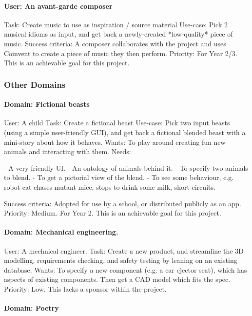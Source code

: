\documentclass[10pt]{article}
\begin{document}
\begin{appendices}
\paragraph{User: An avant-garde composer}   
Task: Create music to use as inspiration / source material   
Use-case: Pick 2 musical idioms as input, and get back a newly-created *low-quality* piece of music.   
Success criteria: A composer collaborates with the project and uses Coinvent to create a piece of music they then perform.      
Priority: For Year 2/3. This is an achievable goal for this project.


\subsubsection{Other Domains}

\paragraph{Domain: Fictional beasts}   
User: A child    
Task: Create a fictional beast
Use-case: Pick two input beasts (using a simple user-friendly GUI), and get back a fictional blended beast with a mini-story about how it behaves.  
Wants: To play around creating fun new animals and interacting with them.
Needs:

 - A very friendly UI.
 - An ontology of animals behind it.
 - To specify two animals to blend.
 - To get a pictorial view of the blend.
 - To see some behaviour, e.g. robot cat chases mutant mice, stops to drink some milk, short-circuits.

Success criteria: Adopted for use by a school, or distributed publicly as an app.         
Priority: Medium. For Year 2. This is an achievable goal for this project.


\paragraph{Domain: Mechanical engineering.   }

User: A mechnical engineer.   
Task: Create a new product, and streamline the 3D modelling, requirements checking, and safety testing by leaning on an existing database.   
Wants: To specify a new component (e.g. a car ejector seat), which has aspects of existing components. Then get a CAD model which fits the spec.   
Priority: Low. This lacks a sponsor within the project.

\paragraph{Domain: Poetry}


\end{appendices}
\end{document}
